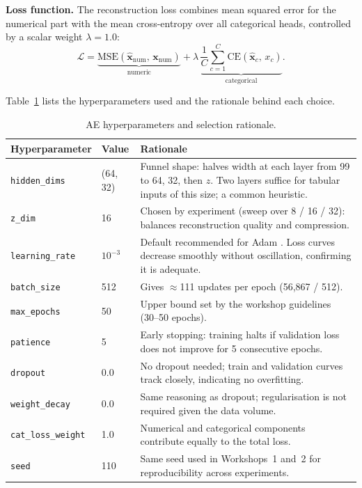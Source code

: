 \documentclass{article}
\begin{document}
\textbf{Loss function.} The reconstruction loss combines mean squared error for the
numerical part with the mean cross-entropy over all categorical heads, controlled by a
scalar weight $\lambda = 1.0$:
\[
\mathcal{L} = \underbrace{\text{MSE}(\hat{\mathbf{x}}_\text{num},\,\mathbf{x}_\text{num})}_{\text{numeric}}
            + \lambda\,\underbrace{\frac{1}{C}\sum_{c=1}^{C}\text{CE}(\hat{\mathbf{x}}_c,\,x_c)}_{\text{categorical}}.
\]

Table~\ref{tab:ae_hparams} lists the hyperparameters used and the rationale behind each choice.

\begin{table}[H]
    \centering
    \caption{AE hyperparameters and selection rationale.}
    \label{tab:ae_hparams}
    \begin{tabularx}{\linewidth}{llX}
        \toprule
        \textbf{Hyperparameter} & \textbf{Value} & \textbf{Rationale} \\
        \midrule
        \texttt{hidden\_dims}    & (64, 32)  & Funnel shape: halves width at each layer from 99 to 64, 32, then $z$. Two layers suffice for tabular inputs of this size; a common heuristic. \\
        \texttt{z\_dim}          & 16        & Chosen by experiment (sweep over 8 / 16 / 32): balances reconstruction quality and compression. \\
        \texttt{learning\_rate}  & $10^{-3}$ & Default recommended for Adam \cite{kingma2014adam}. Loss curves decrease smoothly without oscillation, confirming it is adequate. \\
        \texttt{batch\_size}     & 512       & Gives $\approx$111 updates per epoch (56{,}867 / 512). \\
        \texttt{max\_epochs}     & 50        & Upper bound set by the workshop guidelines (30--50 epochs). \\
        \texttt{patience}        & 5         & Early stopping: training halts if validation loss does not improve for 5 consecutive epochs. \\
        \texttt{dropout}         & 0.0       & No dropout needed; train and validation curves track closely, indicating no overfitting. \\
        \texttt{weight\_decay}   & 0.0       & Same reasoning as dropout; regularisation is not required given the data volume. \\
        \texttt{cat\_loss\_weight} & 1.0     & Numerical and categorical components contribute equally to the total loss. \\
        \texttt{seed}            & 110       & Same seed used in Workshops~1 and~2 for reproducibility across experiments. \\
        \bottomrule
    \end{tabularx}
\end{table}
\end{document}
